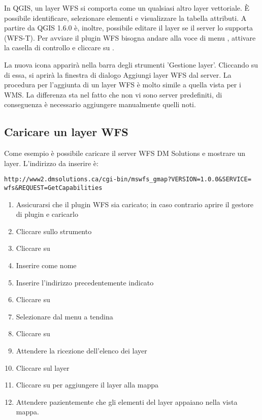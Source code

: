 In QGIS, un layer WFS si comporta come un qualsiasi altro layer vettoriale.
È possibile identificare, selezionare elementi e visualizzare la tabella
attributi. A partire da QGIS 1.6.0 è, inoltre, possibile editare il layer 
se il server lo supporta (WFS-T). Per avviare il plugin WFS bisogna andare alla voce di menu
 \arrow {}, attivare la casella di controllo  e cliccare su . 

La nuova icona  apparirà nella barra degli strumenti 'Gestione layer'.
Cliccando su di essa, si aprirà la finestra di dialogo Aggiungi layer WFS dal server. La procedura 
per l'aggiunta di un layer WFS è molto simile a quella vista per i WMS. La differenza sta nel fatto 
che non vi sono server predefiniti, di conseguenza è necessario aggiungere manualmente quelli noti.

\subsection{Caricare un layer WFS}

Come esempio è possibile caricare il server WFS DM Solutions e mostrare un
layer. L'indirizzo da inserire è:
\begin{verbatim}
http://www2.dmsolutions.ca/cgi-bin/mswfs_gmap?VERSION=1.0.0&SERVICE=
wfs&REQUEST=GetCapabilities
\end{verbatim}

\begin{enumerate}
  \item Assicurarsi che il plugin WFS sia caricato; in caso contrario aprire
  il gestore di plugin e caricarlo
  \item Cliccare sullo strumento 
  \item Cliccare su  
  \item Inserire  come nome
  \item Inserire l'indirizzo precedentemente indicato
  \item Cliccare su  
  \item Selezionare  dal menu a
  tendina
  \item Cliccare su  
  \item Attendere la ricezione dell'elenco dei layer
  \item Cliccare sul layer 
  \item Cliccare su  per aggiungere il layer alla mappa
  \item Attendere pazientemente che gli elementi del layer appaiano nella
  vista mappa.
\end{enumerate}

